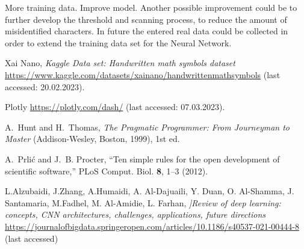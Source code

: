 \documentclass[@CLASSOPTIONS@]{tumarticle}
\begin{document}
More training data.
Improve model.
Another possible improvement could be to further develop the threshold and scanning process,
to reduce the amount of misidentified characters.
In future the entered real data could be collected in order to extend the training data set for the
Neural Network.

\begin{thebibliography}{10}
  \newcommand{\enquote}[1]{``#1''}

  Xai Nano, \emph{Kaggle Data set: Handwritten math symbols dataset}
  \url{https://www.kaggle.com/datasets/xainano/handwrittenmathsymbols}
  (last accessed: 20.02.2023).

  Plotly \url{https://plotly.com/dash/}
  (last accessed: 07.03.2023).

  A.~Hunt and H.~Thomas, \emph{The Pragmatic Programmer: From Journeyman to
    Master} (Addison-Wesley, Boston, 1999), 1st ed.

  A.~Prli{\'c} and J.~B. Procter, \enquote{Ten simple rules for the open
    development of scientific software,} PLoS Comput. Biol. \textbf{8}, 1--3
  (2012).

  L.Alzubaidi, J.Zhang, A.Humaidi, A. Al-Dajuaili, Y. Duan, O. Al-Shamma, J. Santamaria, M.Fadhel, M. Al-Amidie, L. Farhan,
    \emph{]Review of deep learning: concepts, CNN architectures, challenges, applications, future directions}
    \url{https://journalofbigdata.springeropen.com/articles/10.1186/s40537-021-00444-8}
    (last accessed)



\end{thebibliography}
\end{document}

